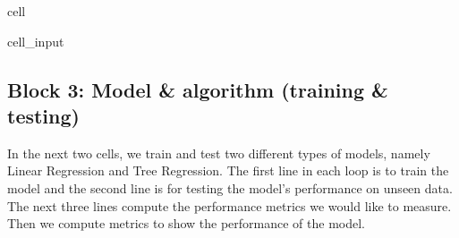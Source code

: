 \documentclass[letterpaper,10pt,english]{jupyterBook}
\begin{document}
\begin{sphinxuseclass}{cell}\begin{sphinxVerbatimInput}

\begin{sphinxuseclass}{cell_input}
\begin{sphinxVerbatim}[commandchars=\\\{\}]
  \PYG{p}{[}   \PYG{p}{]}

  \PYG{p}{[}\PYG{p}{]}
  

  \PYG{p}{[}\PYG{p}{[}\PYG{p}{]}\PYG{p}{]}\PYG{p}{[}\PYG{p}{]}
  \PYG{p}{[}\PYG{p}{[}\PYG{p}{]}\PYG{p}{]}\PYG{p}{[}\PYG{p}{]}
       
\end{sphinxVerbatim}

\end{sphinxuseclass}\end{sphinxVerbatimInput}

\end{sphinxuseclass}

\subsection{Block 3: Model \& algorithm (training \& testing)}
\label{\detokenize{docs/Case1_1_Simple_Retail_Demand_Model:block-3-model-algorithm-training-testing}}
\sphinxAtStartPar
In the next two cells, we train and test two different types of models, namely Linear Regression and Tree Regression. The first line in each loop is to train the model and the second line is for testing the model’s performance on unseen data. The next three lines compute the performance metrics we would like to measure. Then we compute metrics to show the performance of the model.
\end{document}
